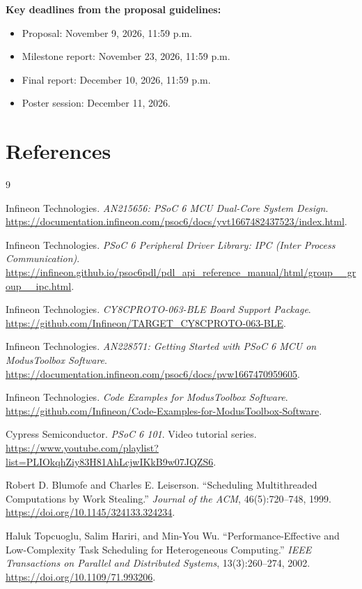 \documentclass[11pt]{article}
\begin{document}
\textbf{Key deadlines from the proposal guidelines:}
\begin{itemize}
  \item Proposal: November 9, 2026, 11:59 p.m.
  \item Milestone report: November 23, 2026, 11:59 p.m.
  \item Final report: December 10, 2026, 11:59 p.m.
  \item Poster session: December 11, 2026.
\end{itemize}

\section*{References}
\begin{thebibliography}{9}

Infineon Technologies.
\textit{AN215656: PSoC 6 MCU Dual-Core System Design}.
\url{https://documentation.infineon.com/psoc6/docs/yvt1667482437523/index.html}.

Infineon Technologies.
\textit{PSoC 6 Peripheral Driver Library:
IPC (Inter Process Communication)}.
\url{https://infineon.github.io/psoc6pdl/pdl_api_reference_manual/html/group__group__ipc.html}.

Infineon Technologies.
\textit{CY8CPROTO-063-BLE Board Support Package}.
\url{https://github.com/Infineon/TARGET_CY8CPROTO-063-BLE}.

Infineon Technologies.
\textit{AN228571: Getting Started with PSoC 6 MCU on
ModusToolbox Software}.
\url{https://documentation.infineon.com/psoc6/docs/pvw1667470959605}.

Infineon Technologies.
\textit{Code Examples for ModusToolbox Software}.
\url{https://github.com/Infineon/Code-Examples-for-ModusToolbox-Software}.

Cypress Semiconductor.
\textit{PSoC 6 101}. Video tutorial series.
\url{https://www.youtube.com/playlist?list=PLIOkqhZiy83H81AhLcjwIKkB9w07JQZS6}.

Robert D. Blumofe and Charles E. Leiserson.
``Scheduling Multithreaded Computations by Work Stealing.''
\textit{Journal of the ACM}, 46(5):720--748, 1999.
\url{https://doi.org/10.1145/324133.324234}.

Haluk Topcuoglu, Salim Hariri, and Min-You Wu.
``Performance-Effective and Low-Complexity Task Scheduling
for Heterogeneous Computing.''
\textit{IEEE Transactions on Parallel and Distributed Systems},
13(3):260--274, 2002.
\url{https://doi.org/10.1109/71.993206}.

\end{thebibliography}
\end{document}
